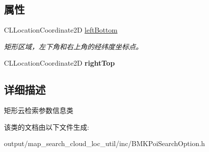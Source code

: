 \subsection*{属性}
\begin{DoxyCompactItemize}
\item 
\hypertarget{interface_b_m_k_bound_search_option_ad68044c4ded82d49551ea014f20e5b67}{C\+L\+Location\+Coordinate2\+D \hyperlink{interface_b_m_k_bound_search_option_ad68044c4ded82d49551ea014f20e5b67}{left\+Bottom}}\label{interface_b_m_k_bound_search_option_ad68044c4ded82d49551ea014f20e5b67}

\begin{DoxyCompactList}\small\item\em 矩形区域，左下角和右上角的经纬度坐标点。 \end{DoxyCompactList}\item 
\hypertarget{interface_b_m_k_bound_search_option_a6864fdcb6ad4d284a17a31d76a4e54f8}{C\+L\+Location\+Coordinate2\+D {\bfseries right\+Top}}\label{interface_b_m_k_bound_search_option_a6864fdcb6ad4d284a17a31d76a4e54f8}

\end{DoxyCompactItemize}


\subsection{详细描述}
矩形云检索参数信息类 

该类的文档由以下文件生成\+:\begin{DoxyCompactItemize}
\item 
output/map\+\_\+search\+\_\+cloud\+\_\+loc\+\_\+util/inc/B\+M\+K\+Poi\+Search\+Option.\+h\end{DoxyCompactItemize}

